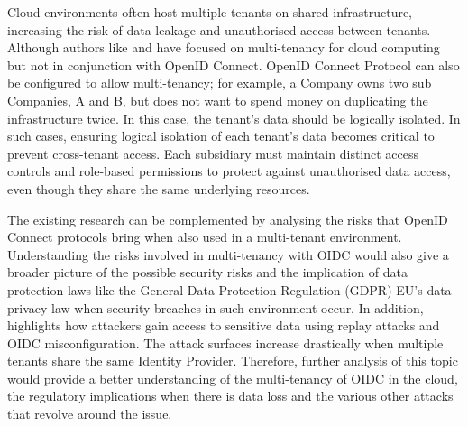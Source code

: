 \begin{itemize}
Cloud environments often host multiple tenants on shared infrastructure, increasing the risk of data leakage and unauthorised access between tenants. Although authors like \citep{multi_tenancy_cloud_risk} and \citep{cloud_shared_resp} have focused on multi-tenancy for cloud computing but not in conjunction with OpenID Connect. OpenID Connect Protocol can also be configured to allow multi-tenancy; for example, a Company owns two sub Companies, A and B, but does not want to spend money on duplicating the infrastructure twice. In this case, the tenant's data should be logically isolated. In such cases, ensuring logical isolation of each tenant's data becomes critical to prevent cross-tenant access. Each subsidiary must maintain distinct access controls and role-based permissions to protect against unauthorised data access, even though they share the same underlying resources. 

The existing research can be complemented by analysing the risks that OpenID Connect protocols bring when also used in a multi-tenant environment. Understanding the risks involved in multi-tenancy with OIDC would also give a broader picture of the possible security risks and the implication of data protection laws like the General Data Protection Regulation (GDPR) EU's data privacy law \citep{gdpr} when security breaches in such environment occur. In addition, \citep{oidc_attacks} highlights how attackers gain access to sensitive data using replay attacks and OIDC misconfiguration. The attack surfaces increase drastically when multiple tenants share the same Identity Provider. Therefore, further analysis of this topic would provide a better understanding of the multi-tenancy of OIDC in the cloud, the regulatory implications when there is data loss and the various other attacks that revolve around the issue.

\end{itemize}
